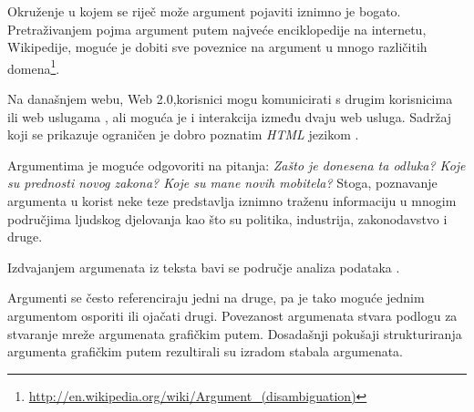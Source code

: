 Okruženje u kojem se riječ može argument pojaviti iznimno je bogato.
Pretraživanjem pojma argument putem najveće enciklopedije na internetu,
Wikipedije, moguće je dobiti sve poveznice na argument u mnogo različitih
domena\footnote{ \url{http://en.wikipedia.org/wiki/Argument_(disambiguation)}}.

Na današnjem webu, Web 2.0,korisnici mogu komunicirati s drugim korisnicima ili
web uslugama , ali moguća je i interakcija između dvaju web
usluga. Sadržaj koji se prikazuje ograničen je dobro poznatim \emph{HTML}
jezikom . 

Argumentima je moguće odgovoriti na pitanja: \emph{Zašto je donesena ta odluka?
Koje su prednosti novog zakona? Koje su mane novih mobitela?} Stoga, poznavanje
argumenta u korist neke teze predstavlja iznimno traženu informaciju u mnogim
područjima ljudskog djelovanja kao što su politika, industrija, zakonodavstvo i
druge. 

Izdvajanjem argumenata iz teksta bavi se područje analiza podataka
.   

Argumenti se često referenciraju jedni na druge, pa je tako moguće jednim
argumentom osporiti ili ojačati drugi. Povezanost argumenata stvara podlogu za
stvaranje mreže argumenata grafičkim putem. Dosadašnji pokušaji strukturiranja
argumenta grafičkim putem rezultirali su izradom stabala argumenata.  
